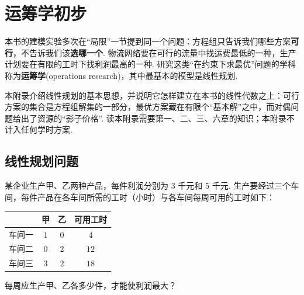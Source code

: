 
\chapter{运筹学初步}\label{app:or}

本书的建模实验多次在“局限”一节提到同一个问题：方程组只告诉我们哪些方案\textbf{可行}，不告诉我们该\textbf{选哪一个}. 物流网络要在可行的流量中找运费最低的一种，生产计划要在有限的工时下找利润最高的一种. 研究这类“在约束下求最优”问题的学科称为\textbf{运筹学}(operations research)，其中最基本的模型是线性规划.

本附录介绍线性规划的基本思想，并说明它怎样建立在本书的线性代数之上：可行方案的集合是方程组解集的一部分，最优方案藏在有限个“基本解”之中，而对偶问题给出了资源的“影子价格”. 读本附录需要第一、二、三、六章的知识；本附录不计入任何学时方案.

\section{线性规划问题}\label{app:or-lp}

\begin{example}\label{eg:or-production}
	某企业生产甲、乙两种产品，每件利润分别为 $3$ 千元和 $5$ 千元. 生产要经过三个车间，每件产品在各车间所需的工时（小时）与各车间每周可用的工时如下：
	\begin{center}
		\begin{tabular}{cccc}
			\toprule
			& 甲 & 乙 & 可用工时 \\
			\midrule
			车间一 & $1$ & $0$ & $4$ \\
			车间二 & $0$ & $2$ & $12$ \\
			车间三 & $3$ & $2$ & $18$ \\
			\bottomrule
		\end{tabular}
	\end{center}
	每周应生产甲、乙各多少件，才能使利润最大？
\end{example}

